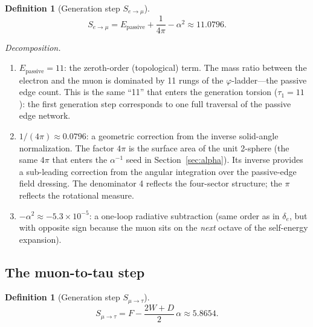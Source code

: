 \documentclass[11pt,a4paper]{article}
\theoremstyle{definition}
\newtheorem{definition}[theorem]{Definition}
\theoremstyle{remark}
\newcommand{\phig}{\varphi}
\newcommand{\Epass}{E_{\mathrm{passive}}}
\begin{document}
\begin{definition}[Generation step $S_{e \to \mu}$]
\label{def:step_emu}
\begin{equation}
  \boxed{S_{e \to \mu} = \Epass + \frac{1}{4\pi} - \alpha^2
  \approx 11.0796.}
  \label{eq:step_emu_full}
\end{equation}
\end{definition}

\noindent\textit{Decomposition.}

\begin{enumerate}[nosep]
  \item $\Epass = 11$: the zeroth-order (topological) term.  The mass ratio
    between the electron and the muon is dominated by 11 rungs of the
    $\phig$-ladder---the passive edge count.  This is the same ``11'' that
    enters the generation torsion ($\tau_1 = 11$): the first generation step
    corresponds to one full traversal of the passive edge network.

  \item $1/(4\pi) \approx 0.0796$: a geometric correction from the inverse
    solid-angle normalization.  The factor $4\pi$ is the surface area of the
    unit 2-sphere (the same $4\pi$ that enters the $\alpha^{-1}$ seed in
    Section~\ref{sec:alpha}).  Its inverse provides a
    sub-leading correction from the angular integration over the passive-edge
    field dressing.  The denominator 4 reflects the four-sector structure;
    the $\pi$ reflects the rotational measure.

  \item $-\alpha^2 \approx -5.3 \times 10^{-5}$: a one-loop radiative
    subtraction (same order as in $\delta_e$, but with opposite sign because
    the muon sits on the \emph{next} octave of the self-energy expansion).
\end{enumerate}

\subsection{The muon-to-tau step}

\begin{definition}[Generation step $S_{\mu \to \tau}$]
\label{def:step_mutau}
\begin{equation}
  \boxed{S_{\mu \to \tau} = F - \frac{2W + D}{2}\,\alpha
  \approx 5.8654.}
  \label{eq:step_mutau_full}
\end{equation}
\end{definition}
\end{document}
